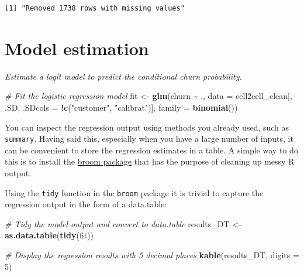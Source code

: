 \documentclass[
]{article}
\newenvironment{Shaded}{\begin{snugshade}}{\end{snugshade}}
\newcommand{\AttributeTok}[1]{\textcolor[rgb]{0.13,0.29,0.53}{#1}}
\newcommand{\CommentTok}[1]{\textcolor[rgb]{0.56,0.35,0.01}{\textit{#1}}}
\newcommand{\DecValTok}[1]{\textcolor[rgb]{0.00,0.00,0.81}{#1}}
\newcommand{\FunctionTok}[1]{\textcolor[rgb]{0.13,0.29,0.53}{\textbf{#1}}}
\newcommand{\NormalTok}[1]{#1}
\newcommand{\OtherTok}[1]{\textcolor[rgb]{0.56,0.35,0.01}{#1}}
\newcommand{\SpecialCharTok}[1]{\textcolor[rgb]{0.81,0.36,0.00}{\textbf{#1}}}
\newcommand{\StringTok}[1]{\textcolor[rgb]{0.31,0.60,0.02}{#1}}
\begin{document}
\begin{verbatim}
[1] "Removed 1738 rows with missing values"
\end{verbatim}

\newpage

\section{Model estimation}\label{model-estimation}

\emph{Estimate a logit model to predict the conditional churn
probability.}

\begin{Shaded}
\begin{Highlighting}[]
\CommentTok{\# Fit the logistic regression model}
\NormalTok{fit }\OtherTok{\textless{}{-}} \FunctionTok{glm}\NormalTok{(churn }\SpecialCharTok{\textasciitilde{}}\NormalTok{ ., }
             \AttributeTok{data =}\NormalTok{ cell2cell\_clean[, .SD, }\AttributeTok{.SDcols =} \SpecialCharTok{!}\FunctionTok{c}\NormalTok{(}\StringTok{"customer"}\NormalTok{, }\StringTok{"calibrat"}\NormalTok{)], }
             \AttributeTok{family =} \FunctionTok{binomial}\NormalTok{())}
\end{Highlighting}
\end{Shaded}

You can inspect the regression output using methods you already used,
such as \texttt{summary}. Having said this, especially when you have a
large number of inputs, it can be convenient to store the regression
estimates in a table. A simple way to do this is to install the
\href{https://cran.r-project.org/web/packages/broom/vignettes/broom.html}{broom
package} that has the purpose of cleaning up messy R output.

Using the \texttt{tidy} function in the \texttt{broom} package it is
trivial to capture the regression output in the form of a data.table:

\begin{Shaded}
\begin{Highlighting}[]
\CommentTok{\# Tidy the model output and convert to data.table}
\NormalTok{results\_DT }\OtherTok{\textless{}{-}} \FunctionTok{as.data.table}\NormalTok{(}\FunctionTok{tidy}\NormalTok{(fit))}

\CommentTok{\# Display the regression results with 5 decimal places}
\FunctionTok{kable}\NormalTok{(results\_DT, }\AttributeTok{digits =} \DecValTok{5}\NormalTok{)}
\end{Highlighting}
\end{Shaded}
\end{document}
